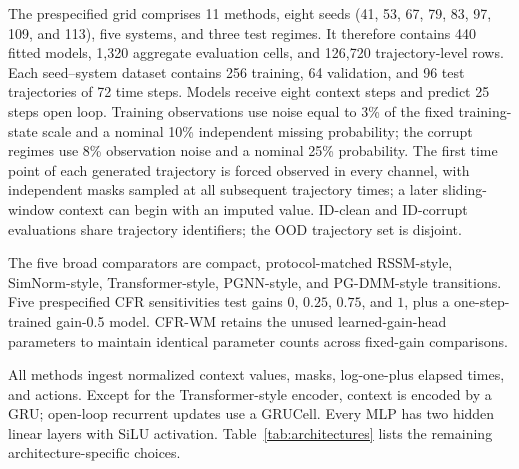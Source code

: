 \documentclass[iicol,pdflatex,sn-basic,Numbered]{sn-jnl}
\begin{document}
\begin{appendices}
The prespecified grid comprises 11 methods, eight seeds (41, 53, 67, 79, 83, 97, 109, and 113), five systems, and three test regimes. It therefore contains 440 fitted models, 1,320 aggregate evaluation cells, and 126,720 trajectory-level rows. Each seed--system dataset contains 256 training, 64 validation, and 96 test trajectories of 72 time steps. Models receive eight context steps and predict 25 steps open loop. Training observations use noise equal to 3\% of the fixed training-state scale and a nominal 10\% independent missing probability; the corrupt regimes use 8\% observation noise and a nominal 25\% probability. The first time point of each generated trajectory is forced observed in every channel, with independent masks sampled at all subsequent trajectory times; a later sliding-window context can begin with an imputed value. ID-clean and ID-corrupt evaluations share trajectory identifiers; the OOD trajectory set is disjoint.

The five broad comparators are compact, protocol-matched RSSM-style,
SimNorm-style, Transformer-style, PGNN-style, and PG-DMM-style transitions. Five
prespecified CFR sensitivities test gains $0$, $0.25$, $0.75$, and $1$, plus a
one-step-trained gain-0.5 model. CFR-WM retains the unused learned-gain-head
parameters to maintain identical parameter counts across fixed-gain comparisons.

All methods ingest normalized context values, masks, log-one-plus elapsed times,
and actions. Except for the Transformer-style encoder, context is encoded by a
GRU; open-loop recurrent updates use a GRUCell. Every MLP has two hidden linear
layers with SiLU activation. Table~\ref{tab:architectures} lists the remaining
architecture-specific choices.


\end{appendices}
\end{document}
